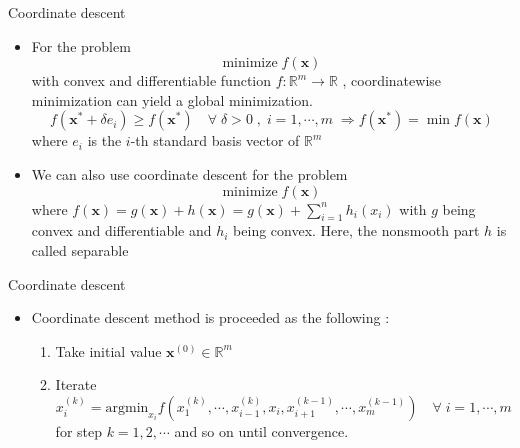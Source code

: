 \documentclass[11pt]{beamer}
\newcommand{\R}{\mathbb{R}}
\begin{document}
\begin{frame}{Coordinate descent}
    \begin{itemize}
        \item For the problem $$\text{minimize} \;f(\mathbf{x})$$ with convex and differentiable function $f:\R^m\rightarrow \R$ , coordinatewise minimization can yield a global minimization. $$f(\mathbf{x}^*+\delta e_i)\geq f(\mathbf{x}^*) \quad \forall\; \delta>0\; ,\; i=1, \cdots ,m \; \Rightarrow f(\mathbf{x}^*)=\min f(\mathbf{x})$$ where $e_i$ is the $i$-th standard basis vector of $\R^m$
        \item We can also use coordinate descent for the problem $$\text{minimize} \;f(\mathbf{x})$$ where $f(\mathbf{x})=g(\mathbf{x})+h(\mathbf{x})=g(\mathbf{x})+\sum_{i=1}^n h_i(x_i)$ with $g$ being convex and differentiable and $h_i$ being convex. Here, the nonsmooth part $h$ is called separable
    \end{itemize}
\end{frame}

\begin{frame}{Coordinate descent}
    \begin{itemize}
        \item Coordinate descent method is proceeded as the following : 
        \begin{enumerate}
            \item Take initial value $\mathbf{x}^{(0)}\in \R^m$
            \item Iterate $$x_i^{(k)}=\text{argmin}_{x_i} f(x_1^{(k)}, \cdots, x_{i-1}^{(k)}, x_i, x_{i+1}^{(k-1)},\cdots,  x_m^{(k-1)})\quad \forall\; i=1, \cdots, m$$ for step $k=1, 2, \cdots $ and so on until convergence.
        \end{enumerate}
    \end{itemize}
\end{frame}
\end{document}
